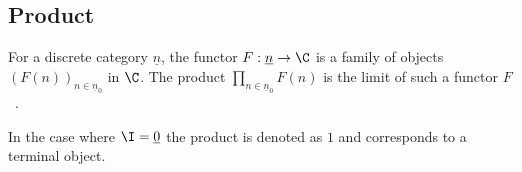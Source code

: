\subsection{Product}

\begin{definition}[Product]\label{def:product_limit}

	For a discrete category $\underline{n}$, the functor $F:\underline{n}\to \C$
	is a family of objects $(F(n))_{n\in \underline{n}_0}$ in $\C$. The product
	$\prod\limits_{n\in \underline{n}_0} F(n)$ is the limit of such a functor
	$F$~\parencite[p.~108]{leinster:basic_category_theory}.
\end{definition}

\begin{remark}
	In the case where $\I=\underline{0}$ the product is denoted as $1$ and
	corresponds to a terminal object.
\end{remark}



